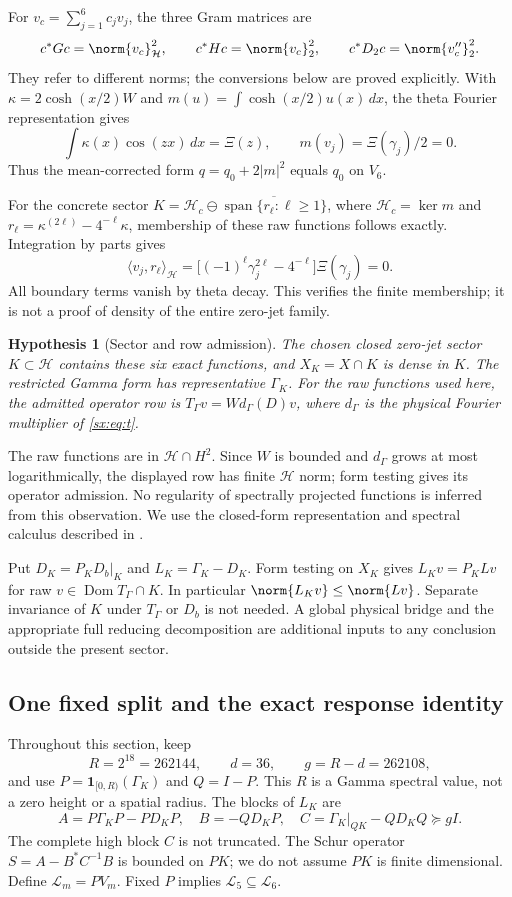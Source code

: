 \documentclass[11pt,a4paper]{article}
\numberwithin{equation}{section}
\newtheorem{hypothesis}[theorem]{Hypothesis}
\theoremstyle{definition}\newtheorem{definition}[theorem]{Definition}
\theoremstyle{remark}\newtheorem{remark}[theorem]{Remark}
\newcommand{\Hh}{\mathcal H}\newcommand{\Hw}{\mathcal H}
\begin{document}
For $v_c=\sum_{j=1}^6c_jv_j$, the three Gram matrices are
\[
 c^*Gc=\norm{v_c}_\Hh^2,\qquad
 c^*Hc=\norm{v_c}_2^2,\qquad
 c^*D_2c=\norm{v_c''}_2^2.
\]
They refer to different norms; the conversions below are proved explicitly.
With $\kappa=2\cosh(x/2)W$ and
$m(u)=\int\cosh(x/2)u(x)\,dx$, the theta Fourier representation
\cite[(1.2)]{fzLagarias} gives
\[
 \int\kappa(x)\cos(zx)\,dx=\Xi(z),\qquad m(v_j)=\Xi(\gamma_j)/2=0.
\]
Thus the mean-corrected form $q=q_0+2|m|^2$ equals $q_0$ on $V_6$.

For the concrete sector
$K=\Hh_c\ominus\overline{\operatorname{span}\{r_\ell:\ell\ge1\}}$,
where $\Hh_c=\ker m$ and
$r_\ell=\kappa^{(2\ell)}-4^{-\ell}\kappa$, membership of these raw
functions follows exactly. Integration by parts gives
\[
 \langle v_j,r_\ell\rangle_\Hh
 =\bigl[(-1)^\ell\gamma_j^{2\ell}-4^{-\ell}\bigr]\Xi(\gamma_j)=0.
\]
All boundary terms vanish by theta decay. This verifies the finite
membership; it is not a proof of density of the entire zero-jet family.

\begin{hypothesis}[Sector and row admission]\label{sx:hyp:sector}
The chosen closed zero-jet sector $K\subset\Hh$ contains these six exact
functions, and $X_K=X\cap K$ is dense in $K$. The restricted Gamma
form has representative $\Gamma_K$. For the raw functions used here,
the admitted operator row is $T_\Gamma v=W d_\Gamma(D)v$, where
$d_\Gamma$ is the physical Fourier multiplier of \eqref{sx:eq:t}.
\end{hypothesis}
The raw functions are in $\Hh\cap H^2$. Since $W$ is bounded and
$d_\Gamma$ grows at most logarithmically, the displayed row has finite
$\Hh$ norm; form testing gives its operator admission. No regularity of
spectrally projected functions is inferred from this observation.
We use the closed-form representation and spectral calculus described
in \cite[Sections 2.3 and 3.1]{gbTeschl}.

Put $D_K=P_KD_b|_K$ and $L_K=\Gamma_K-D_K$. Form testing on $X_K$
gives $L_Kv=P_KLv$ for raw $v\in\operatorname{Dom}T_\Gamma\cap K$.
In particular $\norm{L_Kv}\le\norm{Lv}$. Separate invariance of $K$
under $T_\Gamma$ or $D_b$ is not needed. A global physical bridge and
the appropriate full reducing decomposition are additional inputs to
any conclusion outside the present sector.

\subsection{One fixed split and the exact response identity}
Throughout this section, keep
\[
 R=2^{18}=262144,\qquad d=36,\qquad g=R-d=262108,
\]
and use $P=\mathbf1_{[0,R)}(\Gamma_K)$ and $Q=I-P$.
This $R$ is a Gamma spectral value, not a zero height or a spatial radius.
The blocks of $L_K$ are
\[
 A=P\Gamma_KP-PD_KP,\quad B=-QD_KP,\quad
 C=\Gamma_K|_{QK}-QD_KQ\succeq gI.
\]
The complete high block $C$ is not truncated. The Schur operator
$S=A-B^*C^{-1}B$ is bounded on $PK$; we do not assume $PK$ is finite
dimensional. Define $\mathcal L_m=PV_m$. Fixed $P$ implies
$\mathcal L_5\subseteq\mathcal L_6$.
\end{document}
